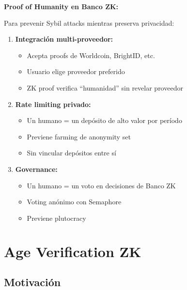 \documentclass[11pt,a4paper,twoside]{book}
\theoremstyle{definition}
\theoremstyle{remark}
\begin{document}
\begin{bancozk}
\textbf{Proof of Humanity en Banco ZK:}

Para prevenir Sybil attacks mientras preserva privacidad:

\begin{enumerate}
    \item \textbf{Integración multi-proveedor:}
    \begin{itemize}
        \item Acepta proofs de Worldcoin, BrightID, etc.
        \item Usuario elige proveedor preferido
        \item ZK proof verifica ``humanidad'' sin revelar proveedor
    \end{itemize}
    
    \item \textbf{Rate limiting privado:}
    \begin{itemize}
        \item Un humano = un depósito de alto valor por período
        \item Previene farming de anonymity set
        \item Sin vincular depósitos entre sí
    \end{itemize}
    
    \item \textbf{Governance:}
    \begin{itemize}
        \item Un humano = un voto en decisiones de Banco ZK
        \item Voting anónimo con Semaphore
        \item Previene plutocracy
    \end{itemize}
\end{enumerate}
\end{bancozk}
\section{Age Verification ZK}
\label{sec:age-verification}

\subsection{Motivación}
\end{document}

